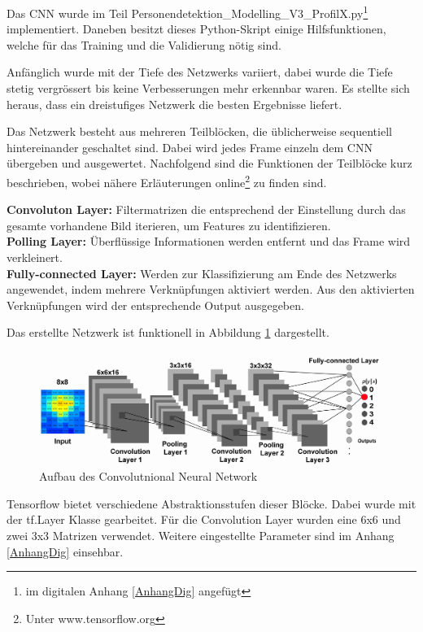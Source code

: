 Das \ac{CNN} wurde im Teil Personendetektion\_Modelling\_V3\_ProfilX.py\footnote[27]{im digitalen Anhang \ref{AnhangDig} angefügt} implementiert. Daneben besitzt dieses Python-Skript einige Hilfsfunktionen, welche für das Training und die Validierung nötig sind.

Anfänglich wurde mit der Tiefe des Netzwerks variiert, dabei wurde die Tiefe stetig vergrössert bis keine Verbesserungen mehr erkennbar waren. Es stellte sich heraus, dass ein dreistufiges Netzwerk die besten Ergebnisse liefert.

Das Netzwerk besteht aus mehreren Teilblöcken, die üblicherweise sequentiell hintereinander geschaltet sind. Dabei wird jedes Frame einzeln dem \ac{CNN} übergeben und ausgewertet. Nachfolgend sind die Funktionen der Teilblöcke kurz beschrieben, wobei nähere Erläuterungen online\footnote[28]{Unter www.tensorflow.org } zu finden sind.

\textbf{Convoluton Layer:} Filtermatrizen die entsprechend der Einstellung durch das gesamte vorhandene Bild iterieren, um Features zu identifizieren.   \\
\textbf{Polling Layer:} Überflüssige Informationen werden entfernt und das Frame wird verkleinert.   \\
\textbf{Fully-connected Layer:} Werden zur Klassifizierung am Ende des Netzwerks angewendet, indem mehrere Verknüpfungen aktiviert werden. Aus den aktivierten Verknüpfungen wird der entsprechende Output ausgegeben.  

Das erstellte Netzwerk ist funktionell in Abbildung \ref{fig:CNN} dargestellt.
\begin{figure}[H]
	\centering
	\includegraphics[width=1\textwidth]
	{fig/CNN_broschuere.jpg}
	\caption[Aufbau des Convolutional Neural Network]{Aufbau des Convolutnional Neural Network}
	\label{fig:CNN}
\end{figure}

Tensorflow bietet verschiedene Abstraktionsstufen dieser Blöcke. Dabei wurde mit der tf.Layer Klasse gearbeitet.
Für die Convolution Layer wurden eine 6x6 und zwei 3x3 Matrizen verwendet. Weitere eingestellte Parameter sind im  Anhang \ref{AnhangDig} einsehbar.

